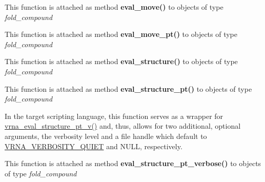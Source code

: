 \begin{DoxyRefList}
\item[\label{wrappers__wrappers000031}%
\Hypertarget{wrappers__wrappers000031}%
Global \mbox{\hyperlink{group__eval_gaff1b9e4f4d17b434b0a822fe783672c1}{vrna\+\_\+eval\+\_\+move}} (vrna\+\_\+fold\+\_\+compound\+\_\+t $\ast$vc, const char $\ast$structure, int m1, int m2)]This function is attached as method {\bfseries eval\+\_\+move()} to objects of type {\itshape fold\+\_\+compound}  
\item[\label{wrappers__wrappers000032}%
\Hypertarget{wrappers__wrappers000032}%
Global \mbox{\hyperlink{group__eval_ga123dabc119ea98c968a5e903cc46f0fb}{vrna\+\_\+eval\+\_\+move\+\_\+pt}} (vrna\+\_\+fold\+\_\+compound\+\_\+t $\ast$vc, short $\ast$pt, int m1, int m2)]This function is attached as method {\bfseries eval\+\_\+move\+\_\+pt()} to objects of type {\itshape fold\+\_\+compound}  
\item[\label{wrappers__wrappers000025}%
\Hypertarget{wrappers__wrappers000025}%
Global \mbox{\hyperlink{group__eval_ga58f199f1438d794a265f3b27fc8ea631}{vrna\+\_\+eval\+\_\+structure}} (vrna\+\_\+fold\+\_\+compound\+\_\+t $\ast$vc, const char $\ast$structure)]This function is attached as method {\bfseries eval\+\_\+structure()} to objects of type {\itshape fold\+\_\+compound}  
\item[\label{wrappers__wrappers000026}%
\Hypertarget{wrappers__wrappers000026}%
Global \mbox{\hyperlink{group__eval_gadbd09372ddfd7a450bbd590c96a6bfe4}{vrna\+\_\+eval\+\_\+structure\+\_\+pt}} (vrna\+\_\+fold\+\_\+compound\+\_\+t $\ast$vc, const short $\ast$pt)]This function is attached as method {\bfseries eval\+\_\+structure\+\_\+pt()} to objects of type {\itshape fold\+\_\+compound}  
\item[\label{wrappers__wrappers000053}%
\Hypertarget{wrappers__wrappers000053}%
Global \mbox{\hyperlink{group__eval_ga0bba59b4d6e53461088666ff4aece7b0}{vrna\+\_\+eval\+\_\+structure\+\_\+pt\+\_\+simple}} (const char $\ast$string, const short $\ast$pt)]In the target scripting language, this function serves as a wrapper for \mbox{\hyperlink{group__eval_ga2c6533ba0afe4c88d335d8f1e0e2a48e}{vrna\+\_\+eval\+\_\+structure\+\_\+pt\+\_\+v()}} and, thus, allows for two additional, optional arguments, the verbosity level and a file handle which default to \mbox{\hyperlink{eval_8h_af4afe19780b61b4962c613bde324128b}{V\+R\+N\+A\+\_\+\+V\+E\+R\+B\+O\+S\+I\+T\+Y\+\_\+\+Q\+U\+I\+ET}} and N\+U\+LL, respectively.  
\item[\label{wrappers__wrappers000028}%
\Hypertarget{wrappers__wrappers000028}%
Global \mbox{\hyperlink{group__eval_ga8a517cfeeae8c376ae7b1e0c401d38b4}{vrna\+\_\+eval\+\_\+structure\+\_\+pt\+\_\+verbose}} (vrna\+\_\+fold\+\_\+compound\+\_\+t $\ast$vc, const short $\ast$pt, F\+I\+LE $\ast$file)]This function is attached as method {\bfseries eval\+\_\+structure\+\_\+pt\+\_\+verbose()} to objects of type {\itshape fold\+\_\+compound}  

\end{DoxyRefList}
